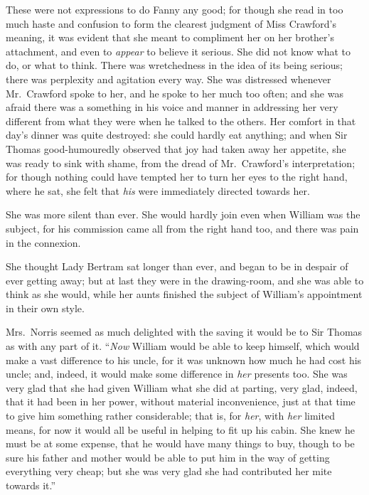 \documentclass{article}
\begin{document}
These were not expressions to do Fanny any good;
for though she read in too much haste and confusion
to form the clearest judgment of Miss Crawford's meaning,
it was evident that she meant to compliment her on her
brother's attachment, and even to \emph{appear} to believe
it serious.  She did not know what to do, or what to think.
There was wretchedness in the idea of its being serious;
there was perplexity and agitation every way.
She was distressed whenever Mr.\ Crawford spoke to her,
and he spoke to her much too often; and she was afraid
there was a something in his voice and manner in addressing
her very different from what they were when he talked
to the others.  Her comfort in that day's dinner
was quite destroyed:  she could hardly eat anything;
and when Sir Thomas good-humouredly observed that joy had
taken away her appetite, she was ready to sink with shame,
from the dread of Mr.\ Crawford's interpretation;
for though nothing could have tempted her to turn her eyes
to the right hand, where he sat, she felt that \emph{his}
were immediately directed towards her.

She was more silent than ever.  She would hardly join
even when William was the subject, for his commission
came all from the right hand too, and there was pain
in the connexion.

She thought Lady Bertram sat longer than ever, and began
to be in despair of ever getting away; but at last they
were in the drawing-room, and she was able to think
as she would, while her aunts finished the subject
of William's appointment in their own style.

Mrs.\ Norris seemed as much delighted with the saving
it would be to Sir Thomas as with any part of it.
``\emph{Now} William would be able to keep himself, which would
make a vast difference to his uncle, for it was unknown
how much he had cost his uncle; and, indeed, it would make
some difference in \emph{her} presents too.  She was very glad
that she had given William what she did at parting,
very glad, indeed, that it had been in her power,
without material inconvenience, just at that time to give
him something rather considerable; that is, for \emph{her},
with \emph{her} limited means, for now it would all be useful
in helping to fit up his cabin.  She knew he must be at
some expense, that he would have many things to buy,
though to be sure his father and mother would be able
to put him in the way of getting everything very cheap;
but she was very glad she had contributed her mite
towards it.''
\end{document}
